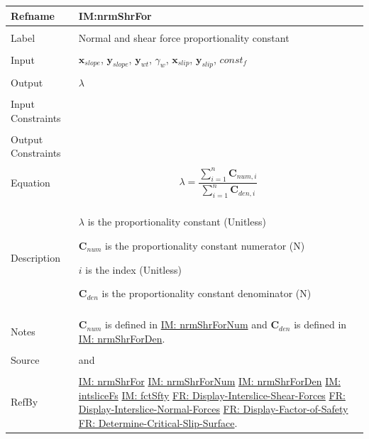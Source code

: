 \documentclass[12pt]{article}
\begin{document}
\noindent \begin{minipage}{\textwidth}
\begin{tabular}{p{} p{}}
\toprule \textbf{Refname} & \textbf{IM:nrmShrFor}
\label{IM:nrmShrFor}
\\ \midrule \\
Label & Normal and shear force proportionality constant
\\ \midrule \\
Input & ${\mathbf{x}_{slope}}$, ${\mathbf{y}_{slope}}$, ${\mathbf{y}_{wt}}$, ${γ_{w}}$, ${\mathbf{x}_{slip}}$, ${\mathbf{y}_{slip}}$, $const_f$
\\ \midrule \\
Output & $λ$
\\ \midrule \\
Input Constraints & 
\\ \midrule \\
Output Constraints & 
\\ \midrule \\
Equation & \begin{displaymath}
           λ=\frac{\displaystyle\sum_{i=1}^{n}{{\mathbf{C}_{num,i}}}}{\displaystyle\sum_{i=1}^{n}{{\mathbf{C}_{den,i}}}}
           \end{displaymath}
\\ \midrule \\
Description & \begin{symbDescription}
              \item{$λ$ is the proportionality constant (Unitless)}
              \item{${\mathbf{C}_{num}}$ is the proportionality constant numerator (N)}
              \item{$i$ is the index (Unitless)}
              \item{${\mathbf{C}_{den}}$ is the proportionality constant denominator (N)}
              \end{symbDescription}
\\ \midrule \\
Notes & ${\mathbf{C}_{num}}$ is defined in \hyperref[IM:nrmShrForNum]{IM: nrmShrForNum} and ${\mathbf{C}_{den}}$ is defined in \hyperref[IM:nrmShrForDen]{IM: nrmShrForDen}.
\\ \midrule \\
Source & \cite{chen2005} and \cite{karchewski2012}
\\ \midrule \\
RefBy & \hyperref[IM:nrmShrFor]{IM: nrmShrFor} \hyperref[IM:nrmShrForNum]{IM: nrmShrForNum} \hyperref[IM:nrmShrForDen]{IM: nrmShrForDen} \hyperref[IM:intsliceFs]{IM: intsliceFs} \hyperref[IM:fctSfty]{IM: fctSfty} \hyperref[displayShear]{FR: Display-Interslice-Shear-Forces} \hyperref[displayNormal]{FR: Display-Interslice-Normal-Forces} \hyperref[displayFS]{FR: Display-Factor-of-Safety} \hyperref[determineCritSlip]{FR: Determine-Critical-Slip-Surface}.
\\ \bottomrule \end{tabular}
\end{minipage}
\end{document}
